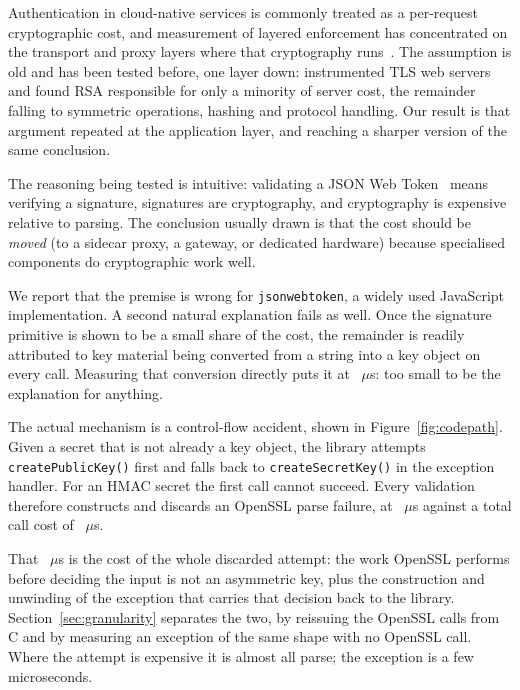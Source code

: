 \documentclass[preprint,12pt,authoryear]{elsarticle}
\newcommand{\LibraryName}{\texttt{jsonwebtoken}}
\begin{document}
Authentication in cloud-native services is commonly treated as a per-request
cryptographic cost, and measurement of layered enforcement has concentrated on
the transport and proxy layers where that cryptography
runs~\citep{zhu2023dissecting}.
The assumption is old and has been tested before, one layer down: \citet{coarfa2006performance} instrumented TLS web servers and found RSA
responsible for only a minority of server cost, the remainder falling to
symmetric operations, hashing and protocol handling. Our result is that
argument repeated at the application layer, and reaching a sharper version of
the same conclusion.

The reasoning being tested is intuitive: validating a JSON Web
Token~\citep{rfc7519} means verifying a signature, signatures are cryptography,
and cryptography is expensive relative to parsing. The conclusion usually drawn
is that the cost should be \emph{moved} (to a sidecar proxy, a gateway, or
dedicated hardware) because specialised components do cryptographic work
well.

We report that the premise is wrong for \LibraryName{}, a widely used
JavaScript implementation. A second natural explanation fails as well. Once the
signature primitive is shown to be a small share of the cost, the remainder is
readily attributed to key material being converted from a string into a key
object on every call. Measuring that conversion directly puts it at
\HostCreateSecretKey~$\mu$s: too small to be the explanation for anything.

The actual mechanism is a control-flow accident, shown in
Figure~\ref{fig:codepath}. Given a secret that is not already a key object, the
library attempts \texttt{createPublicKey()} first and falls back to
\texttt{createSecretKey()} in the exception handler. For an HMAC secret the
first call cannot succeed. Every validation therefore constructs and discards
an OpenSSL parse failure, at \HostProbeThrows~$\mu$s against a total call cost
of \HostJwtString~$\mu$s.

That \HostProbeThrows~$\mu$s is the cost of
the whole discarded attempt: the work OpenSSL performs before deciding the
input is not an asymmetric key, plus the construction and unwinding of the
exception that carries that decision back to the library.
Section~\ref{sec:granularity} separates the two, by reissuing the OpenSSL calls
from C and by measuring an exception of the same shape with no OpenSSL call.
Where the attempt is expensive it is almost all parse; the exception is a few
microseconds.
\end{document}
